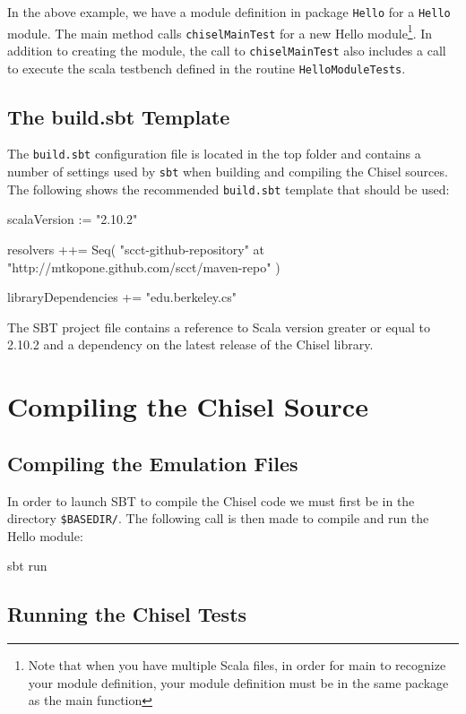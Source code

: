 In the above example, we have a module definition in package \verb+Hello+ for a \verb+Hello+ module. The main method calls \verb+chiselMainTest+ for a new Hello module\footnote{Note that when you have multiple Scala files, in order for main to recognize your module definition, your module definition must be in the same package as the main function}. In addition to creating the module, the call to \verb+chiselMainTest+ also includes a call to execute the scala testbench defined in the routine \verb+HelloModuleTests+.

\subsection{The build.sbt Template}

The \verb+build.sbt+ configuration file is located in the top folder and contains a number of settings used by \verb+sbt+ when building and compiling the Chisel sources.  The following shows the recommended \verb+build.sbt+ template that should be used:

\begin{scala}
scalaVersion := "2.10.2"

resolvers ++= Seq(
  "scct-github-repository" at "http://mtkopone.github.com/scct/maven-repo"
)

libraryDependencies += 
  "edu.berkeley.cs" %
\end{scala}

The SBT project file contains a reference to Scala version greater or equal to 2.10.2 and a dependency on the latest release of the Chisel library.

\section{Compiling the Chisel Source}

\subsection{Compiling the Emulation Files}

In order to launch SBT to compile the Chisel code we must first be in the directory \verb+$BASEDIR/+. The following call is then made to compile and run the Hello module:

\begin{bash}
sbt run
\end{bash}

\subsection{Running the Chisel Tests}

